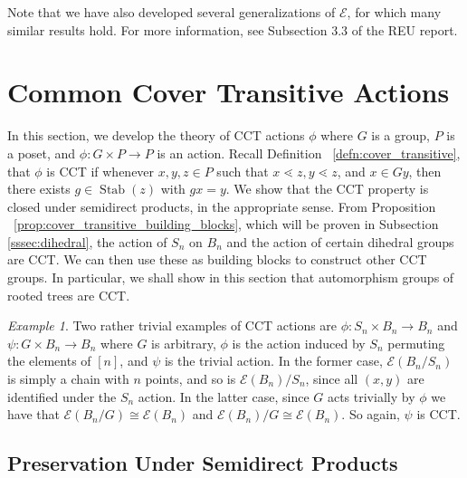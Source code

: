 \documentclass[smallextended, envcountsame, numbook]{svjour3}
\theoremstyle{plain}
\theoremstyle{definition}
\theoremstyle{remark}
\newtheorem{eg}[thm]{Example}
\numberwithin{equation}{section}
\newcommand\ssec{\subsection}
\newcommand\Stab{\operatorname{Stab}}
\begin{document}
Note that we have also developed several generalizations of $\mathcal E$, for which many similar results hold. For more information, see Subsection 3.3 of the REU report.


\section{Common Cover Transitive Actions}
\label{sec:cover_transitive}
In this section, we develop the theory of CCT actions $\phi$ where $G$ is a group, $P$ is a poset, and $\phi:G\times P \rightarrow P$ is an action. Recall Definition ~\ref{defn:cover_transitive}, that $\phi$ is CCT if whenever $x,y,z \in P$ such that $x\lessdot z,y\lessdot z$, and $x \in Gy$, then there exists $g \in \Stab(z)$ with $gx = y$.  We show that the CCT property is closed under semidirect products, in the appropriate sense. From Proposition ~\ref{prop:cover_transitive_building_blocks}, which will be proven in Subsection \ref{sssec:dihedral}, the action of $S_n$ on $B_n$ and the action of certain dihedral groups are CCT. We can then use these as building blocks to construct other CCT groups. In particular, we shall show in this section that automorphism groups of rooted trees are CCT.

\begin{eg}
\label{eg:trivial_edgequot}
Two rather trivial examples of CCT actions are $\phi\colon S_n\times B_n \rightarrow B_n$ and $\psi\colon G\times B_n\rightarrow B_n$ where $G$ is arbitrary, $\phi$ is the action induced by $S_n$ permuting the elements of $[n]$, and $\psi$ is the trivial action. In the former case, $\mathcal E(B_n/S_n)$ is simply a chain with $n$ points, and so is $\mathcal E(B_n)/S_n$, since all $(x, y)$ are identified under the $S_n$ action. In the latter case, since $G$ acts trivially by $\phi$ we have that $\mathcal E(B_n/G) \cong \mathcal E(B_n)$ and $\mathcal E(B_n)/G \cong \mathcal E(B_n)$. So again, $\psi$ is CCT.
\end{eg}

\ssec{Preservation Under Semidirect Products}
\label{ssec:semidirect_product_preservation}
\end{document}
